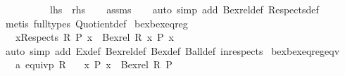 \begin{isabellebody}
\ \ \ \ \ \ \ \ \ {\isacharparenleft}{\kern0pt}\ {\isachardoublequoteopen}{\isacharquery}{\kern0pt}lhs\ {\isacharequal}{\kern0pt}\ {\isacharquery}{\kern0pt}rhs{\isachardoublequoteclose}{\isacharparenright}{\kern0pt}\isanewline
%
\isadelimproof
\ \ %
\endisadelimproof
%
\isatagproof
{}\isamarkupfalse%
\ assms\isanewline
\ \ \isamarkupfalse%
\ {\isacharparenleft}{\kern0pt}auto\ simp\ add{\isacharcolon}{\kern0pt}\ Bex{}{\isacharunderscore}{\kern0pt}rel{\isacharunderscore}{\kern0pt}def\ Respects{\isacharunderscore}{\kern0pt}def{\isacharparenright}{\kern0pt}\isanewline
\ \ \isamarkupfalse%
\ {\isacharparenleft}{\kern0pt}metis\ {\isacharparenleft}{\kern0pt}full{\isacharunderscore}{\kern0pt}types{\isacharparenright}{\kern0pt}\ Quotient{}{\isacharunderscore}{\kern0pt}def{\isacharparenright}{\kern0pt}{\isacharplus}{\kern0pt}%
\endisatagproof
{\isafoldproof}%
%
\isadelimproof
\isanewline
%
\endisadelimproof
\isanewline
{}\isamarkupfalse%
\ bex{}{\isacharunderscore}{\kern0pt}bexeq{\isacharunderscore}{\kern0pt}reg{\isacharcolon}{\kern0pt}\isanewline
\ \ \ {\isachardoublequoteopen}{\isacharparenleft}{\kern0pt}{\isasymexists}{\isacharbang}{\kern0pt}x{\isasymin}Respects\ R{\isachardot}{\kern0pt}\ P\ x{\isacharparenright}{\kern0pt}\ {\isasymlongrightarrow}\ {\isacharparenleft}{\kern0pt}Bex{}{\isacharunderscore}{\kern0pt}rel\ R\ {\isacharparenleft}{\kern0pt}{\isasymlambda}x{\isachardot}{\kern0pt}\ P\ x{\isacharparenright}{\kern0pt}{\isacharparenright}{\kern0pt}{\isachardoublequoteclose}\isanewline
%
\isadelimproof
\ \ %
\endisadelimproof
%
\isatagproof
{}\isamarkupfalse%
\ {\isacharparenleft}{\kern0pt}auto\ simp\ add{\isacharcolon}{\kern0pt}\ Ex{}{\isacharunderscore}{\kern0pt}def\ Bex{}{\isacharunderscore}{\kern0pt}rel{\isacharunderscore}{\kern0pt}def\ Bex{\isacharunderscore}{\kern0pt}def\ Ball{\isacharunderscore}{\kern0pt}def\ in{\isacharunderscore}{\kern0pt}respects{\isacharparenright}{\kern0pt}%
\endisatagproof
{\isafoldproof}%
%
\isadelimproof
\isanewline
%
\endisadelimproof
\isanewline
{}\isamarkupfalse%
\ bex{}{\isacharunderscore}{\kern0pt}bexeq{\isacharunderscore}{\kern0pt}reg{\isacharunderscore}{\kern0pt}eqv{\isacharcolon}{\kern0pt}\isanewline
\ \ \ a{\isacharcolon}{\kern0pt}\ {\isachardoublequoteopen}equivp\ R{\isachardoublequoteclose}\isanewline
\ \ \ {\isachardoublequoteopen}{\isacharparenleft}{\kern0pt}{\isasymexists}{\isacharbang}{\kern0pt}x{\isachardot}{\kern0pt}\ P\ x{\isacharparenright}{\kern0pt}\ {\isasymlongrightarrow}\ Bex{}{\isacharunderscore}{\kern0pt}rel\ R\ P{\isachardoublequoteclose}\isanewline

\end{isabellebody}
